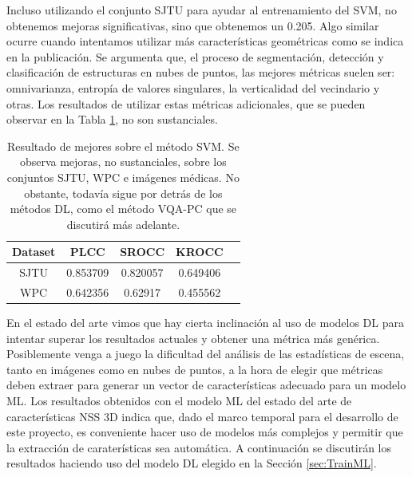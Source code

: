 Incluso utilizando el conjunto SJTU\cite{SJTU} para ayudar al entrenamiento 
del SVM, no obtenemos mejoras significativas, sino que obtenemos un 0.205.
Algo similar ocurre cuando intentamos utilizar más características geométricas
como se indica en la publicación\cite{3DNSSMetrics}. Se argumenta que, el proceso de segmentación, 
detección y clasificación de estructuras en nubes de puntos, 
las mejores métricas suelen ser: 
omnivarianza, entropía de valores singulares, la verticalidad del vecindario y 
otras. Los resultados de utilizar estas métricas adicionales, que 
se pueden observar en la Tabla \ref{tab:ImprovNR3DQA}, no son sustanciales.

\begin{table}[htp]
  \begin{center}
    \begin{tabular}[c]{|c|c|c|c|c|}
      \hline
      \rowcolor[HTML]{FFC702}
      \textbf{Dataset} & \textbf{PLCC} & \textbf{SROCC} & \textbf{KROCC} \\ 
      \hline
      SJTU & 0.853709 & 0.820057 & 0.649406 \\ 
      \hline 
      WPC & 0.642356 & 0.62917 & 0.455562 \\
      \hline
    \end{tabular}
  \end{center}
  \caption[Resultado de mejores sobre el método SVM]{Resultado de mejores sobre el método SVM.
   Se observa mejoras, no sustanciales, sobre los conjuntos SJTU\cite{SJTU}, WPC\cite{WPC1, WPC2} e imágenes médicas.
   No obstante, todavía sigue por detrás de los métodos DL, como el método VQA-PC 
   que se discutirá más adelante.
  }
  \label{tab:ImprovNR3DQA}
\end{table}

En el estado del arte vimos que hay cierta inclinación al uso de modelos 
DL para intentar superar los resultados actuales y obtener una métrica más 
genérica. Posiblemente venga a juego la dificultad del análisis de las estadísticas 
de escena, tanto en imágenes como en nubes de puntos, a la hora de elegir que métricas 
deben extraer para generar un vector de características adecuado para un modelo ML. 
Los resultados obtenidos con el modelo ML del estado del arte de características NSS 3D
indica que, dado el marco temporal para el desarrollo de este proyecto, 
es conveniente hacer uso de modelos más complejos 
y permitir que la extracción de caraterísticas sea automática. 
A continuación se discutirán los resultados haciendo uso del modelo DL elegido
en la Sección \ref{sec:TrainML}. 


